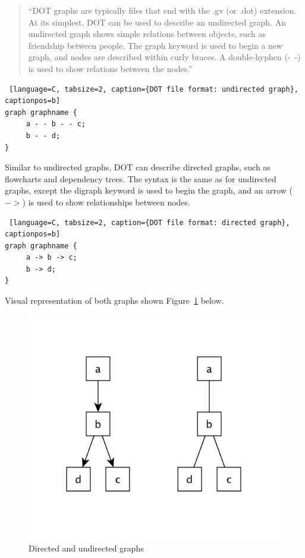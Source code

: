 \begin{quotation}
``DOT graphs are typically files that end with the .gv (or .dot) extension.
At its simplest, DOT can be used to describe an undirected graph.
An undirected graph shows simple relations between objects, such as friendship between people.
The graph keyword is used to begin a new graph, and nodes are described within curly braces.
A double-hyphen (-\ -) is used to show relations between the nodes.''~\cite{DOT}
\end{quotation}

\begin{center}
\renewcommand{\thelstlisting}{\thesection.\arabic{lstlisting}}
\begin{lstlisting} [language=C, tabsize=2, caption={DOT file format: undirected graph}, captionpos=b]
graph graphname {
     a - - b - - c;
     b - - d;
}
\end{lstlisting}
\end{center}

Similar to undirected graphs, DOT can describe directed graphs, such as flowcharts and dependency trees. The syntax is the same as for undirected graphs, except the digraph keyword is used to begin the graph, and an arrow ($->$) is used to show relationships between nodes.~\cite{DOT}

\begin{center}
\renewcommand{\thelstlisting}{\thesection.\arabic{lstlisting}}
\begin{lstlisting} [language=C, tabsize=2, caption={DOT file format: directed graph}, captionpos=b]
graph graphname {
     a -> b -> c;
     b -> d;
}
\end{lstlisting}
\end{center}

Visual representation of both graphs shown Figure~\ref{fig:dot_graphs} below.

\begin{figure}[h!]
\centering
\includegraphics[scale=0.3]{pictures/dot_graph.png}
\caption{Directed and undirected graphs}
\label{fig:dot_graphs}
\end{figure}


